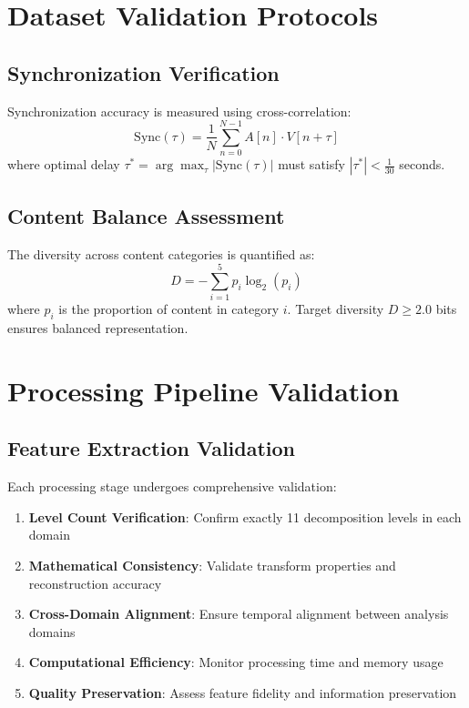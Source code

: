 \section{Dataset Validation Protocols}

\subsection{Synchronization Verification}

\begin{definition}
Synchronization accuracy is measured using cross-correlation:
\begin{equation}
\text{Sync}(τ) = \frac{1}{N}\sum_{n=0}^{N-1} A[n] \cdot V[n+τ]
\end{equation}
where optimal delay $τ^* = \arg\max_τ |\text{Sync}(τ)|$ must satisfy $|τ^*| < \frac{1}{30}$ seconds.
\end{definition}

\subsection{Content Balance Assessment}

\begin{definition}
The diversity across content categories is quantified as:
\begin{equation}
D = -\sum_{i=1}^{5} p_i \log_2(p_i)
\end{equation}
where $p_i$ is the proportion of content in category $i$. Target diversity $D \geq 2.0$ bits ensures balanced representation.
\end{definition}

\section{Processing Pipeline Validation}

\subsection{Feature Extraction Validation}

Each processing stage undergoes comprehensive validation:

\begin{enumerate}
    \item \textbf{Level Count Verification}: Confirm exactly 11 decomposition levels in each domain
    \item \textbf{Mathematical Consistency}: Validate transform properties and reconstruction accuracy
    \item \textbf{Cross-Domain Alignment}: Ensure temporal alignment between analysis domains
    \item \textbf{Computational Efficiency}: Monitor processing time and memory usage
    \item \textbf{Quality Preservation}: Assess feature fidelity and information preservation
\end{enumerate}

